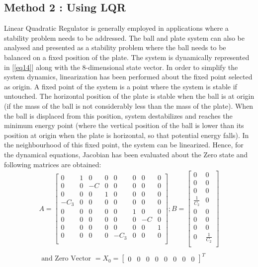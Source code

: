 \documentclass[conference]{IEEEtran}
\begin{document}
\subsection{Method 2 : Using LQR}
Linear Quadratic Regulator is generally employed in applications where a stability problem needs to be addressed. The ball and plate system can also be analysed and presented as a stability problem where the ball needs to be balanced on a fixed position of the plate. The system is dynamically represented in [\ref{eq14}] along with the 8-dimensional state vector. In order to simplify the system dynamics, linearization has been performed about the fixed point selected as origin. A fixed point of the system is a point where the system is stable if untouched. The horizontal position of the plate is stable when the ball is at origin (if the mass of the ball is not considerably less than the mass of the plate). When the ball is displaced from this position, system destabilizes and reaches the minimum energy point (where the vertical position of the ball is lower than its position at origin when the plate is horizontal, so that potential energy falls). In the neighbourhood of this fixed point, the system can be linearized. Hence, for the dynamical equations, Jacobian has been evaluated about the Zero state and following matrices are obtained: 
\begin{equation}\begin{split}
A = \begin{bmatrix}
0 & 1 & 0 & 0 & 0 & 0 & 0 & 0 \\
0 & 0 & -C & 0 & 0 & 0 & 0 & 0 \\
0 & 0 & 0 & 1 & 0 & 0 & 0 & 0 \\
-C_3 & 0 & 0 & 0 & 0 & 0 & 0 & 0 \\
0 & 0 & 0 & 0 & 0 & 1 & 0 & 0 \\
0 & 0 & 0 & 0 & 0 & 0 & -C & 0 \\
0 & 0 & 0 & 0 & 0 & 0 & 0 & 1 \\
0 & 0 & 0 & 0 & -C_3 & 0 & 0 & 0 \\
\end{bmatrix} ; 
B = \begin{bmatrix}
0 & 0 \\
0 & 0 \\
0 & 0 \\
\frac{1}{C_2} & 0 \\
0 & 0 \\
0 & 0 \\
0 & 0 \\
0 & \frac{1}{C_2} \\
\end{bmatrix}
\\\\
\mbox{ and Zero Vector } = X_0 = \begin{bmatrix}0 &0 &0 &0 &0 &0 &0 &0\end{bmatrix}^T
\end{split}\label{eq19}\end{equation}
\end{document}
